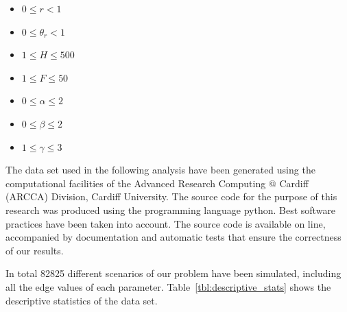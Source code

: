 \documentclass[10pt]{article}
\begin{document}
\begin{itemize}
\item \(0 \leq r < 1\)
\item \(0 \leq \theta_r < 1\)
\item \(1 \leq H \leq 500\)
\item \(1 \leq F \leq 50\)
\item \(0 \leq \alpha \leq 2\)
\item \(0 \leq \beta \leq 2\)
\item \(1 \leq \gamma \leq 3\)
\end{itemize}


The data set used in the following analysis have been generated using the 
computational facilities of the Advanced Research Computing @ Cardiff (ARCCA) 
Division, Cardiff University. The source code for the purpose of this
research was produced using the programming language python. Best software
practices have been taken into account. The source code is available on line, %
accompanied by documentation and automatic tests that ensure the correctness
of our results.

In total 82825 different scenarios of our problem have been simulated, including
all the edge values of each parameter. Table~\ref{tbl:descriptive_stats} shows
the descriptive statistics of the data set.
\end{document}
